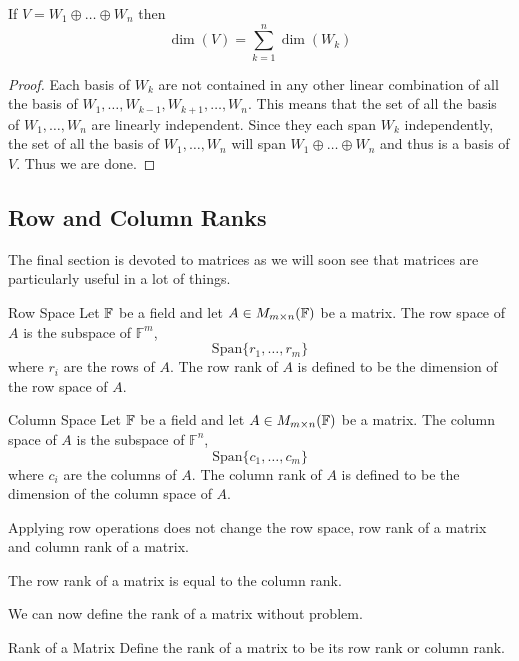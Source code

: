 \documentclass[a4paper]{article}
\begin{document}
\begin{crl}{}{} If $V=W_1\oplus\dots\oplus W_n$ then $$\dim(V)=\sum_{k=1}^n\dim(W_k)$$ 
\begin{proof}
Each basis of $W_k$ are not contained in any other linear combination of all the basis of $W_1,\dots,W_{k-1},W_{k+1},\dots,W_n$. This means that the set of all the basis of $W_1,\dots,W_n$ are linearly independent. Since they each span $W_k$ independently, the set of all the basis of $W_1,\dots,W_n$ will span $W_1\oplus\dots\oplus W_n$ and thus is a basis of $V$. Thus we are done. 
\end{proof}
\end{crl}

\subsection{Row and Column Ranks}
The final section is devoted to matrices as we will soon see that matrices are particularly useful in a lot of things. 
\begin{defn}{Row Space}{} Let $\mathbb{F}$ be a field and let $A\in M_{m\times n}(\mathbb{F})$ be a matrix. The row space of $A$ is the subspace of $\mathbb{F}^m$, $$\text{Span}\{r_1,\dots,r_m\}$$ where $r_i$ are the rows of $A$. The row rank of $A$ is defined to be the dimension of the row space of $A$. 
\end{defn}

\begin{defn}{Column Space}{} Let $\mathbb{F}$ be a field and let $A\in M_{m\times n}(\mathbb{F})$ be a matrix. The column space of $A$ is the subspace of $\mathbb{F}^n$, $$\text{Span}\{c_1,\dots,c_m\}$$ where $c_i$ are the columns of $A$. The column rank of $A$ is defined to be the dimension of the column space of $A$. 
\end{defn}

\begin{lmm}{}{} Applying row operations does not change the row space, row rank of a matrix and column rank of a matrix. 
\end{lmm}

\begin{thm}{}{} The row rank of a matrix is equal to the column rank. 
\end{thm}

We can now define the rank of a matrix without problem. 

\begin{defn}{Rank of a Matrix}{} Define the rank of a matrix to be its row rank or column rank. 
\end{defn}
\end{document}
